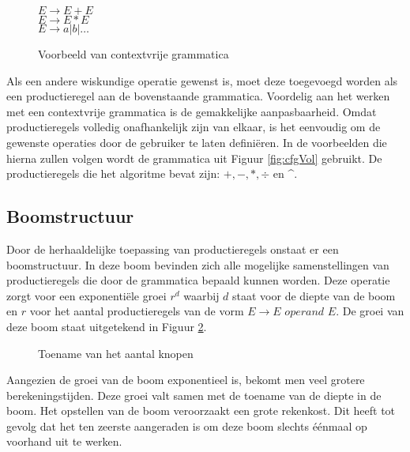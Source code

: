 \documentclass[Main.tex]{subfiles}
\begin{document}
\begin{figure}[!htb]
\centering
\begin{framed}
$E \rightarrow E + E$ \\
$E \rightarrow E \ast E$ \\
$E \rightarrow a | b | \dotsc$
\end{framed}
\caption{Voorbeeld van contextvrije grammatica}
\label{fig:cfg}
\end{figure}
Als een andere wiskundige operatie gewenst is, moet deze toegevoegd worden als een productieregel aan de bovenstaande grammatica. Voordelig aan het werken met een contextvrije grammatica is de gemakkelijke aanpasbaarheid. Omdat productieregels volledig onafhankelijk zijn van elkaar, is het eenvoudig om de gewenste operaties door de gebruiker te laten defini\"eren. In de voorbeelden die hierna zullen volgen wordt de grammatica uit Figuur \ref{fig:cfgVol} gebruikt. De productieregels die het algoritme bevat zijn: $+, -, \ast, \div$ en \^{}.

\subsection{Boomstructuur}

Door de herhaaldelijke toepassing van productieregels onstaat er een boomstructuur. In deze boom bevinden zich alle mogelijke samenstellingen van productieregels die door de grammatica bepaald kunnen worden. Deze operatie zorgt voor een exponenti\"ele groei $r^{d}$ waarbij $d$ staat voor de diepte van de boom en $r$ voor het aantal productieregels van de vorm $E \rightarrow E$  $operand$ $ E$. De groei van deze boom staat uitgetekend in Figuur \ref{fig:treeSize}.

\begin{figure}[!htb]
\centering
{}
\caption{Toename van het aantal knopen}
\label{fig:treeSize}
\end{figure}


Aangezien de groei van de boom exponentieel is, bekomt men veel grotere berekeningstijden. Deze groei valt samen met de toename van de diepte in de boom. Het opstellen van de boom veroorzaakt een grote rekenkost. Dit heeft tot gevolg dat het ten zeerste aangeraden is om deze boom slechts \'e\'enmaal op voorhand uit te werken.
\end{document}
